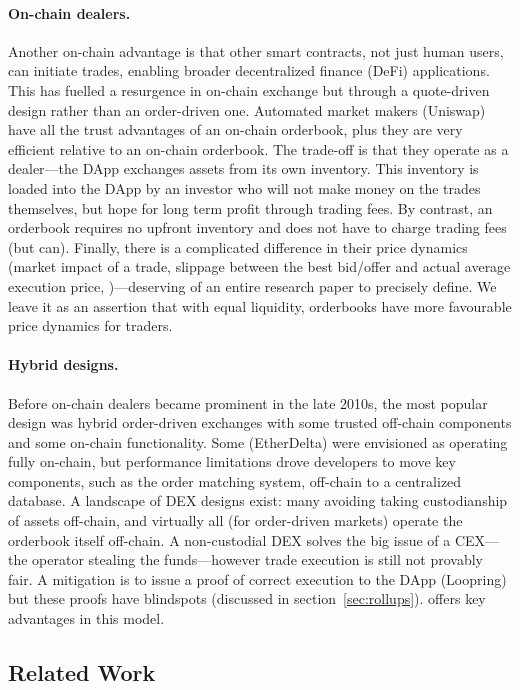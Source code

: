 \paragraph{On-chain dealers.} Another on-chain advantage is that other smart contracts, not just human users, can initiate trades, enabling broader decentralized finance (DeFi) applications. This has fuelled a resurgence in on-chain exchange but through a quote-driven design rather than an order-driven one. Automated market makers  (\eg Uniswap) have all the trust advantages of an on-chain orderbook, plus they are very efficient relative to an on-chain orderbook. The trade-off is that they operate as a dealer---the DApp exchanges assets from its own inventory. This inventory is loaded into the DApp by an investor who will not make money on the trades themselves, but hope for long term profit through trading fees. By contrast, an orderbook requires no upfront inventory and does not have to charge trading fees (but can). Finally, there is a complicated difference in their price dynamics (\eg market impact of a trade, slippage between the best bid/offer and actual average execution price, \etc)---deserving of an entire research paper to precisely define. We leave it as an assertion that with equal liquidity, orderbooks have more favourable price dynamics for traders.

\paragraph{Hybrid designs.} Before on-chain dealers became prominent in the late 2010s, the most popular design was hybrid order-driven exchanges with some trusted off-chain components and some on-chain functionality. Some (\eg EtherDelta) were envisioned as operating fully on-chain, but performance limitations drove developers to move key components, such as the order matching system, off-chain to a centralized database. A landscape of DEX designs exist: many avoiding taking custodianship of assets off-chain, and virtually all (for order-driven markets) operate the orderbook itself off-chain. A non-custodial DEX solves the big issue of a CEX---the operator stealing the funds---however trade execution is still not provably fair. A mitigation is to issue a proof of correct execution to the DApp (\eg Loopring) but these proofs have blindspots (discussed in section~\ref{sec:rollups}). \cm offers key advantages in this model. 

\subsection{Related Work}

